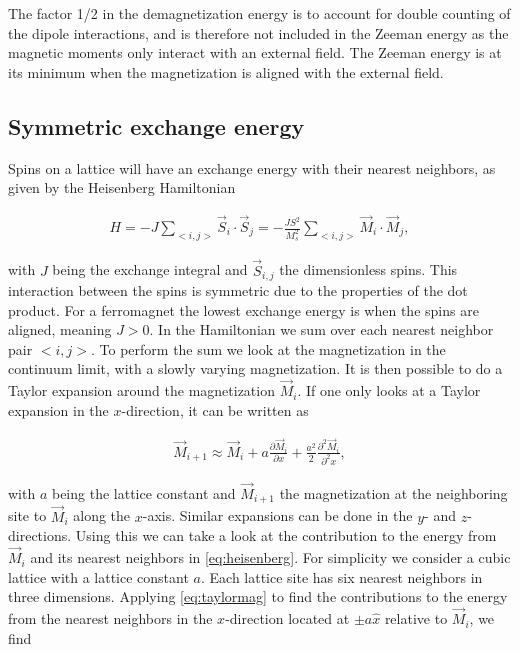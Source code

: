 \documentclass[1p]{elsarticle}		%
\numberwithin{equation}{section}
\begin{document}
The factor 1/2 in the demagnetization energy is to account for double counting of the dipole interactions, and is therefore not included in the Zeeman energy as the magnetic moments only interact with an external field. The Zeeman energy is at its minimum when the magnetization is aligned with the external field.

\subsection{Symmetric exchange energy}
Spins on a lattice will have an exchange energy with their nearest neighbors, as given by the Heisenberg Hamiltonian

\begin{align}
\label{eq:heisenberg}
H = -J\sum_{<i, j>} \vec{S}_i\cdot\vec{S}_j = -\frac{J S^2}{M_s^2}\sum_{<i, j>} \vec{M}_i\cdot\vec{M}_j,
\end{align}

with $J$ being the exchange integral and $\vec{S}_{i,j}$ the dimensionless spins. This interaction between the spins is symmetric due to the properties of the dot product. For a ferromagnet the lowest exchange energy is when the spins are aligned, meaning $J>0$. In the Hamiltonian we sum over each nearest neighbor pair $<i, j>$. To perform the sum we look at the magnetization in the continuum limit, with a slowly varying magnetization. It is then possible to do a Taylor expansion around the magnetization $\vec{M}_i$. If one only looks at a Taylor expansion in the $x$-direction, it can be written as

\begin{align}
\label{eq:taylormag}
\vec{M}_{i+1} \approx \vec{M}_i + a\frac{\partial \vec{M}_i}{\partial x} + \frac{a^2}{2}\frac{\partial^2 \vec{M}_i}{\partial^2 x},
\end{align}

with $a$ being the lattice constant and $\vec{M}_{i+1}$ the magnetization at the neighboring site to $\vec{M}_i$ along the $x$-axis. Similar expansions can be done in the $y$- and $z$-directions. Using this we can take a look at the contribution to the energy from $\vec{M}_i$ and its nearest neighbors in \eqref{eq:heisenberg}. For simplicity we consider a cubic lattice with a lattice constant $a$. Each lattice site has six nearest neighbors in three dimensions. Applying \eqref{eq:taylormag} to find the contributions to the energy from the nearest neighbors in the $x$-direction located at $\pm a \hat{x}$ relative to $\vec{M}_i$, we find
\end{document}
